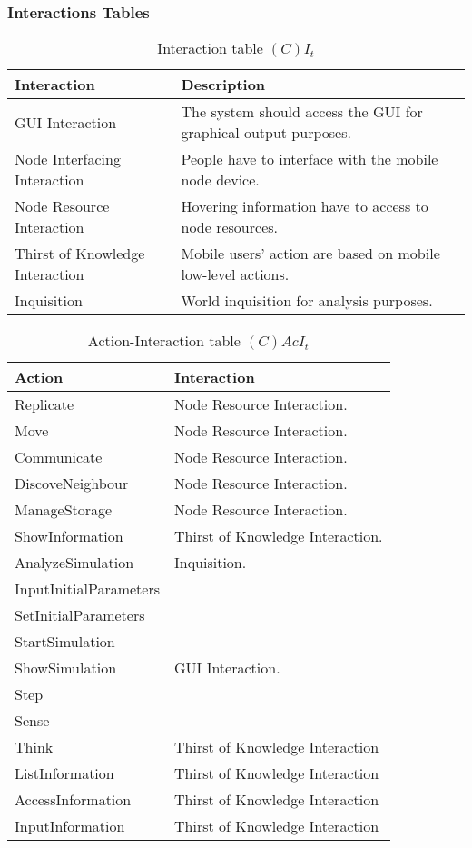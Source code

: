 \subsubsection{Interactions Tables}

\begin{table}[H]
	\centering
	\begin{tabular}{|p{4cm}|p{8cm}|}
			\hline
			\textbf{Interaction} & \textbf{Description} \\
			\hline
			GUI Interaction & The system should access the GUI for graphical output
			purposes. \\
			\hline
			Node Interfacing Interaction & People have to interface with the mobile node
			device. \\
			\hline
			Node Resource Interaction & Hovering information have to access to node
			resources. \\
			\hline
			Thirst of Knowledge Interaction & Mobile users' action are based on mobile
			low-level actions. \\
			\hline
			Inquisition & World inquisition for analysis purposes. \\
			\hline
		\end{tabular}
	\caption{Interaction table $(C)I_t$}
	\label{tab:cit}
\end{table}

\begin{table}[H]
	\centering
	\begin{tabular}{|p{4cm}|p{8cm}|}
			\hline
			\textbf{Action} & \textbf{Interaction} \\
			\hline
			Replicate & Node Resource Interaction. \\
			\hline
			Move & Node Resource Interaction. \\
			\hline
			Communicate & Node Resource Interaction.\\
			\hline
			DiscoveNeighbour & Node Resource Interaction. \\
			\hline
			ManageStorage & Node Resource Interaction. \\
			\hline
			ShowInformation & Thirst of Knowledge Interaction.\\
			\hline
			AnalyzeSimulation & Inquisition. \\
			\hline
			InputInitialParameters & \\
			\hline
			SetInitialParameters & \\
			\hline
			StartSimulation & \\
			\hline
			ShowSimulation & GUI Interaction. \\
			\hline
			Step & \\
			\hline
			Sense & \\
			\hline
			Think & Thirst of Knowledge Interaction \\
			\hline
			ListInformation & Thirst of Knowledge Interaction \\
			\hline
			AccessInformation & Thirst of Knowledge Interaction \\
			\hline
			InputInformation & Thirst of Knowledge Interaction \\
			\hline
		\end{tabular}
	\caption{Action-Interaction table $(C)AcI_t$}
	\label{tab:cacit}
\end{table}

